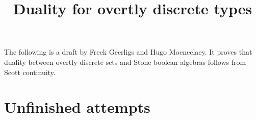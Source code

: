 \documentclass{../util/zariski}
\title{Duality for overtly discrete types}
\begin{document}
\maketitle
The following is a draft by Freek Geerligs and Hugo Moeneclaey. It proves that duality between overtly discrete sets and Stone boolean algebras follows from Scott continuity. 

\tableofcontents



\section{Unfinished attempts}

\printindex

\printbibliography
\end{document}
